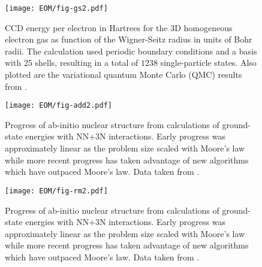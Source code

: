 \documentclass[thesis.tex]{subfiles}
\begin{document}
\begin{figure}[h]
  \texttt{[image: EOM/fig-gs2.pdf]}
  \caption{CCD energy per electron in Hartrees for the 3D homogeneous electron gas as function of the Wigner-Seitz radius in units of Bohr radii. The calculation used periodic boundary conditions and a basis with 25 shells, resulting in a total of $1238$ single-particle states. Also plotted are the variational quantum Monte Carlo (QMC) results from \cite{LOPEZ2006}.}
  \label{fig:QDground}
\end{figure}

\begin{figure}[h]
  \centering
  \texttt{[image: EOM/fig-add2.pdf]}
  \caption{Progress of ab-initio nuclear structure from calculations of ground-state energies with NN+3N interactions.  Early progress was approximately linear as the problem size scaled with Moore's law while more recent progress has taken advantage of new algorithms which have outpaced Moore's law.  Data taken from \cite{HERGERTPRIVATE}.}
  \label{fig:QDadd}
\end{figure}

\begin{figure}[h]
  \centering
  \texttt{[image: EOM/fig-rm2.pdf]}
  \caption{Progress of ab-initio nuclear structure from calculations of ground-state energies with NN+3N interactions.  Early progress was approximately linear as the problem size scaled with Moore's law while more recent progress has taken advantage of new algorithms which have outpaced Moore's law.  Data taken from \cite{HERGERTPRIVATE}.}
  \label{fig:QDrm}
\end{figure}
\end{document}

